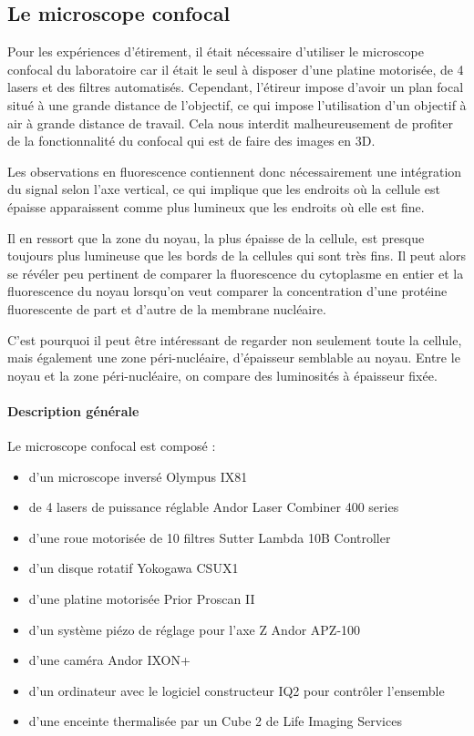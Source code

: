	\subsection{Le microscope confocal}
	
	Pour les expériences d'étirement, il était nécessaire d'utiliser le microscope confocal du laboratoire car il était le seul à disposer d'une platine motorisée, de 4 lasers et des filtres automatisés. Cependant, l'étireur impose d'avoir un plan focal situé à une grande distance de l'objectif, ce qui impose l'utilisation d'un objectif à air à grande distance de travail. Cela nous interdit malheureusement de profiter de la fonctionnalité du confocal qui est de faire des images en 3D. 
	
	Les observations en fluorescence contiennent donc nécessairement une intégration du signal selon l'axe vertical, ce qui implique que les endroits où la cellule est épaisse apparaissent comme plus lumineux que les endroits où elle est fine. 
	
	Il en ressort que la zone du noyau, la plus épaisse de la cellule, est presque toujours plus lumineuse que les bords de la cellules qui sont très fins. 
	Il peut alors se révéler peu pertinent de comparer la fluorescence du cytoplasme en entier et la fluorescence du noyau lorsqu'on veut comparer la concentration d'une protéine fluorescente de part et d'autre de la membrane nucléaire.
	
	C'est pourquoi il peut être intéressant de regarder non seulement toute la cellule, mais également une zone péri-nucléaire, d'épaisseur semblable au noyau. Entre le noyau et la zone péri-nucléaire, on compare des luminosités à épaisseur fixée.
	
	\paragraph{Description générale}
	
	Le microscope confocal est composé : 
	\begin{itemize}
	\item d'un microscope inversé Olympus IX81
	\item de 4 lasers de puissance réglable Andor Laser Combiner 400 series
	\item d'une roue motorisée de 10 filtres Sutter Lambda 10B Controller
	\item d'un disque rotatif Yokogawa CSUX1
	\item d'une platine motorisée Prior Proscan II
	\item d'un système piézo de réglage pour l'axe Z Andor APZ-100
	\item d'une caméra Andor IXON+
	\item d'un ordinateur avec le logiciel constructeur IQ2 pour contrôler l'ensemble
	\item d'une enceinte thermalisée par un Cube 2 de Life Imaging Services
\end{itemize}	 

